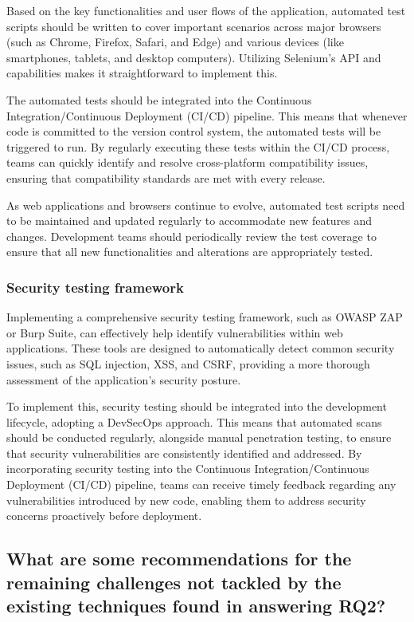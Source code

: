 \documentclass[a4paper, 11pt]{article}  %
\begin{document}
Based on the key functionalities and user flows of the application, automated test scripts should be written to cover important scenarios across major browsers (such as Chrome, Firefox, Safari, and Edge) and various devices (like smartphones, tablets, and desktop computers). Utilizing Selenium's API and capabilities makes it straightforward to implement this.

The automated tests should be integrated into the Continuous Integration/Continuous Deployment (CI/CD) pipeline\cite{choudhary2010webdiff}. This means that whenever code is committed to the version control system, the automated tests will be triggered to run. By regularly executing these tests within the CI/CD process, teams can quickly identify and resolve cross-platform compatibility issues, ensuring that compatibility standards are met with every release.

As web applications and browsers continue to evolve, automated test scripts need to be maintained and updated regularly to accommodate new features and changes. Development teams should periodically review the test coverage to ensure that all new functionalities and alterations are appropriately tested.

\subsubsection{Security testing framework}
\vspace{0.25cm} %
Implementing a comprehensive security testing framework, such as OWASP ZAP or Burp Suite, can effectively help identify vulnerabilities within web applications. These tools are designed to automatically detect common security issues, such as SQL injection, XSS, and CSRF, providing a more thorough assessment of the application's security posture.

To implement this, security testing should be integrated into the development lifecycle, adopting a DevSecOps approach. This means that automated scans should be conducted regularly, alongside manual penetration testing, to ensure that security vulnerabilities are consistently identified and addressed\cite{peroli2018mobster}. By incorporating security testing into the Continuous Integration/Continuous Deployment (CI/CD) pipeline, teams can receive timely feedback regarding any vulnerabilities introduced by new code, enabling them to address security concerns proactively before deployment.


\subsection{What are some recommendations for the remaining challenges not tackled by the existing techniques found in answering RQ2?}
\end{document}
